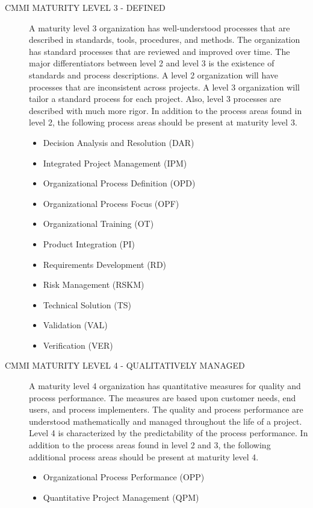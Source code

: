 \documentclass[SDSUThesis.tex]{subfiles}
\begin{document}
\begin{description}
        \item[CMMI MATURITY LEVEL 3 - DEFINED]
            A maturity level 3 organization has well-understood 
            processes that are described in 
            standards, tools, procedures, and methods.  The 
            organization has standard processes
            that are reviewed and improved over time.  The 
            major differentiators between level 2 
            and level 3 is the existence of standards and process descriptions. 
            A level 2 organization will have
            processes that are inconsistent across projects.  
            A level 3 organization will tailor
            a standard process for each project.  Also, 
            level 3 processes are described with 
            much more rigor.  In addition to the process areas found in level 2, 
            the following process areas should be present at maturity level 3.
            \begin{itemize}
                \item Decision Analysis and Resolution (DAR)
                \item Integrated Project Management (IPM)
                \item Organizational Process Definition (OPD)
                \item Organizational Process Focus (OPF)
                \item Organizational Training (OT)
                \item Product Integration (PI)
                \item Requirements Development (RD)
                \item Risk Management (RSKM)
                \item Technical Solution (TS)
                \item Validation (VAL)
                \item Verification (VER)
            \end{itemize}
            
        \item[CMMI MATURITY LEVEL 4 - QUALITATIVELY MANAGED]
            A maturity level 4 organization has quantitative 
            measures for quality and process performance. 
            The measures are based upon customer needs, 
            end users, and process implementers.  
            The quality
            and process performance are understood mathematically and managed 
            throughout the life of a project.
            Level 4 is characterized by the predictability of the process performance. 
            In addition to
            the process areas found in level 2 and 3, the following additional 
            process areas should be present
            at maturity level 4.
            \begin{itemize}
                \item Organizational Process Performance (OPP)
                \item Quantitative Project Management (QPM)
            \end{itemize}
            

\end{description}
\end{document}
